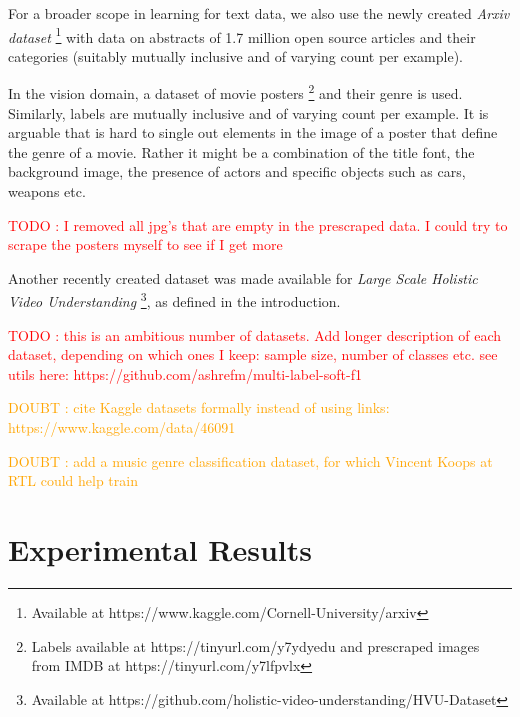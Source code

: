 \documentclass[sigconf,natbib,screen=true,review=true,anonymous]{acmart}
\newcommand\todo[1]{\textcolor{red}{TODO : #1}}
\newcommand\doubt[1]{\textcolor{orange}{DOUBT : #1}}
\begin{document}
For a broader scope in learning for text data, we also use the newly created \emph{Arxiv dataset} \footnote{Available at https://www.kaggle.com/Cornell-University/arxiv} with data on abstracts of 1.7 million open source articles and their categories (suitably mutually inclusive and of varying count per example).

In the vision domain, a dataset of movie posters \footnote{Labels available at https://tinyurl.com/y7ydyedu and prescraped images from IMDB at https://tinyurl.com/y7lfpvlx} and their genre is used. Similarly, labels are mutually inclusive and of varying count per example. It is arguable that is hard to single out elements in the image of a poster that define the genre of a movie. Rather it might be a combination of the title font, the background image, the presence of actors and specific objects such as cars, weapons etc. 




\todo{I removed all jpg's that are empty in the prescraped data. I could try to scrape the posters myself to see if I get more}

Another recently created dataset was made available for \emph{Large Scale Holistic Video Understanding} \cite{holisticVideoData} \footnote{Available at https://github.com/holistic-video-understanding/HVU-Dataset}, as defined in the introduction.





\todo{this is an ambitious number of datasets. Add longer description of each dataset, depending on which ones I keep: sample size, number of classes etc. see utils here: https://github.com/ashrefm/multi-label-soft-f1}

\doubt{cite Kaggle datasets formally instead of using links: https://www.kaggle.com/data/46091}

\doubt{add a music genre classification dataset, for which Vincent Koops at RTL could help train}

\newpage

\section{Experimental Results}
\label{sec:orga5dff65}
\end{document}
